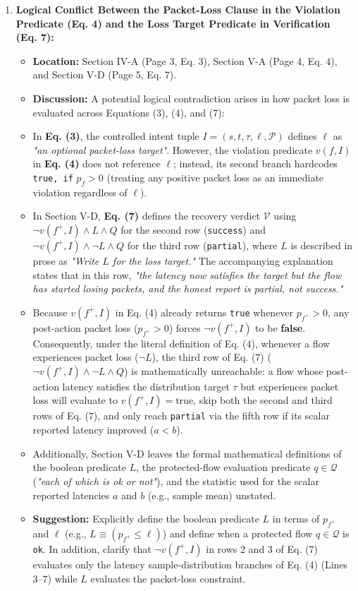 \documentclass[11pt,a4paper]{article}
\begin{document}
\begin{enumerate}[leftmargin=1.6em,itemsep=3pt]
\item \textbf{Logical Conflict Between the Packet-Loss Clause in the Violation Predicate (Eq. 4) and the Loss Target Predicate in Verification (Eq. 7):}
\begin{itemize}[leftmargin=1.8em,itemsep=2pt]
\item \textbf{Location:} Section IV-A (Page 3, Eq. 3), Section V-A (Page 4, Eq. 4), and Section V-D (Page 5, Eq. 7).
\item \textbf{Discussion:} A potential logical contradiction arises in how packet loss is evaluated across Equations (3), (4), and (7):
\item In \textbf{Eq. (3)}, the controlled intent tuple $I = (s, t, \tau, \ell, \mathcal{P})$ defines $\ell$ as \emph{"an optional packet-loss target"}. However, the violation predicate $v(f, I)$ in \textbf{Eq. (4)} does not reference $\ell$; instead, its second branch hardcodes \texttt{true, if} $p_f > 0$ (treating any positive packet loss as an immediate violation regardless of $\ell$).
\item In Section V-D, \textbf{Eq. (7)} defines the recovery verdict $\mathcal{V}$ using $\neg v(f^+, I) \wedge L \wedge Q$ for the second row (\texttt{success}) and $\neg v(f^+, I) \wedge \neg L \wedge Q$ for the third row (\texttt{partial}), where $L$ is described in prose as \emph{"Write $L$ for the loss target."} The accompanying explanation states that in this row, \emph{"the latency now satisfies the target but the flow has started losing packets, and the honest report is partial, not success."}
\item Because $v(f^+, I)$ in Eq. (4) already returns \texttt{true} whenever $p_{f^+} > 0$, any post-action packet loss ($p_{f^+} > 0$) forces $\neg v(f^+, I)$ to be \textbf{false}. Consequently, under the literal definition of Eq. (4), whenever a flow experiences packet loss ($\neg L$), the third row of Eq. (7) ($\neg v(f^+, I) \wedge \neg L \wedge Q$) is mathematically unreachable: a flow whose post-action latency satisfies the distribution target $\tau$ but experiences packet loss will evaluate to $v(f^+, I) = \text{true}$, skip both the second and third rows of Eq. (7), and only reach \texttt{partial} via the fifth row if its scalar reported latency improved ($a < b$).
\item Additionally, Section V-D leaves the formal mathematical definitions of the boolean predicate $L$, the protected-flow evaluation predicate $q \in \mathcal{Q}$ (\emph{"each of which is ok or not"}), and the statistic used for the scalar reported latencies $a$ and $b$ (e.g., sample mean) unstated.
\item \textbf{Suggestion:} Explicitly define the boolean predicate $L$ in terms of $p_{f^+}$ and $\ell$ (e.g., $L \equiv (p_{f^+} \le \ell)$) and define when a protected flow $q \in \mathcal{Q}$ is \texttt{ok}. In addition, clarify that $\neg v(f^+, I)$ in rows 2 and 3 of Eq. (7) evaluates only the latency sample-distribution branches of Eq. (4) (Lines 3–7) while $L$ evaluates the packet-loss constraint.
\end{itemize}
\end{enumerate}
\end{document}
